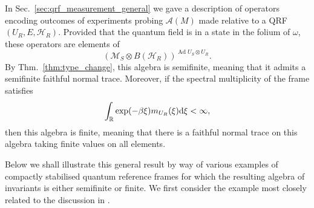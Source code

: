 \documentclass[sn-mathphys-num]{sn-jnl}%
\newcommand{\RR}{\mathbb{R}}
\newcommand{\HH}{\mathcal{H}}
\newcommand{\MM}{\mathcal{M}}
\newcommand{\Af}{\mathscr{A}}
\DeclareMathOperator{\Ad}{Ad}
\newcommand{\diff}{\textup{d}}
\numberwithin{equation}{section}
\theoremstyle{thmstyleone}%
\theoremstyle{thmstyletwo}%
\theoremstyle{thmstylethree}%
\begin{document}
  In Sec.\ \ref{sec:qrf_measurement_general} we gave a description of operators encoding outcomes of experiments probing $\Af(M)$ made relative to a QRF $(U_R,E,\HH_R)$. Provided that the quantum field is in a state in the folium of $\omega$, these operators are elements of
\begin{equation}
    (\MM_S\otimes B(\HH_R))^{\Ad U_S\otimes U_R}.
\end{equation}
By Thm.\ \ref{thm:type_change}, this algebra is semifinite, meaning that it admits a semifinite faithful normal trace. Moreover, if the spectral multiplicity of the frame satisfies
\begin{equation}
    \int_\RR \exp(-\beta\xi)m_{U_R}(\xi)\diff \xi<\infty,
\end{equation}
then this algebra is finite, meaning that there is a faithful normal trace on this algebra taking finite values on all elements.

Below we shall illustrate this general result by way of various examples of compactly stabilised quantum reference frames for which the resulting algebra of invariants is either semifinite or finite. We first consider the example most closely related to the discussion in \cite{chandrasekaran2023algebra}.
\end{document}
